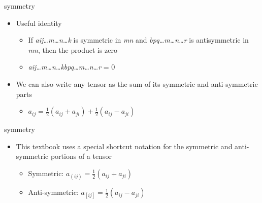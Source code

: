\documentclass[
  letterpaper,
  ignorenonframetext,
  aspectratio=43,
  handout,
  12pt]{beamer}
\providecommand{\tightlist}{%
  \setlength{\itemsep}{0pt}\setlength{\parskip}{0pt}}
\providecommand{\tightlist}{%
\setlength{\itemsep}{0pt}\setlength{\parskip}{0pt}}
\begin{document}
\begin{frame}{symmetry}
\protect\hypertarget{symmetry-1}{}
\begin{itemize}
\tightlist
\item
  Useful identity

  \begin{itemize}
  \tightlist
  \item
    If \emph{a}\emph{ij\ldots m\ldots n\ldots k} is symmetric in
    \emph{mn} and \emph{b}\emph{pq\ldots m\ldots n\ldots r} is
    antisymmetric in \emph{mn}, then the product is zero
  \item
    \emph{a}\emph{ij\ldots m\ldots n\ldots k}\emph{b}\emph{pq\ldots m\ldots n\ldots r}
    = 0
  \end{itemize}
\item
  We can also write any tensor as the sum of its symmetric and
  anti-symmetric parts

  \begin{itemize}
  \tightlist
  \item
    \(a_{ij} = \frac{1}{2} (a_{ij} + a_{ji}) + \frac{1}{2} (a_{ij} - a_{ji})\)
  \end{itemize}
\end{itemize}
\end{frame}

\begin{frame}{symmetry}
\protect\hypertarget{symmetry-2}{}
\begin{itemize}
\tightlist
\item
  This textbook uses a special shortcut notation for the symmetric and
  anti-symmetric portions of a tensor

  \begin{itemize}
  \tightlist
  \item
    Symmetric: \(a_{(ij)} = \frac{1}{2}(a_{ij}+a_{ji})\)
  \item
    Anti-symmetric: \(a_{[ij]} = \frac{1}{2}(a_{ij}-a_{ji})\)
  \end{itemize}
\end{itemize}
\end{frame}
\end{document}
